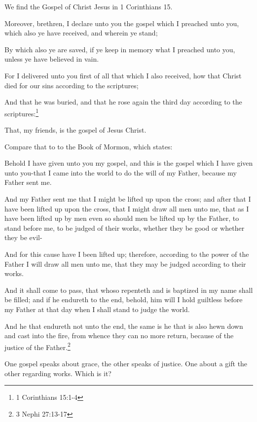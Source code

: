 We find the Gospel of Christ Jesus in 1 Corinthians 15.

\begin{displayquote}
Moreover, brethren, I declare unto you the gospel which I preached unto you, 
which also ye have received, and wherein ye stand;

By which also ye are saved, if ye keep in memory what I preached unto you, 
unless ye have believed in vain.

For I delivered unto you first of all that which I also received, how that 
Christ died for our sins according to the scriptures;

And that he was buried, and that he rose again the third day according to the 
scriptures:\footnote{1 Corinthians 15:1-4}
\end{displayquote}

That, my friends, is the gospel of Jesus Christ.

Compare that to to the Book of Mormon, which states:

\begin{displayquote}
Behold I have given unto you my gospel, and this is the gospel which I have 
given unto you-that I came into the world to do the will of my Father, because 
my Father sent me.

And my Father sent me that I might be lifted up upon the cross; and after that I 
have been lifted up upon the cross, that I might draw all men unto me, that as I 
have been lifted up by men even so should men be lifted up by the Father, to 
stand before me, to be judged of their works, whether they be good or whether 
they be evil-

And for this cause have I been lifted up; therefore, according to the power of 
the Father I will draw all men unto me, that they may be judged according to 
their works.

And it shall come to pass, that whoso repenteth and is baptized in my name shall 
be filled; and if he endureth to the end, behold, him will I hold guiltless 
before my Father at that day when I shall stand to judge the world.

And he that endureth not unto the end, the same is he that is also hewn down and 
cast into the fire, from whence they can no more return, because of the justice 
of the Father.\footnote{3 Nephi 27:13-17}
\end{displayquote}

One gospel speaks about grace, the other speaks of justice. One about a gift the 
other regarding works. Which is it?
